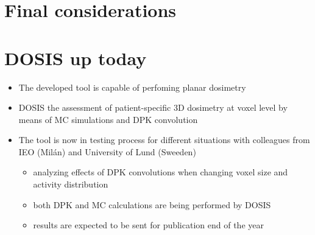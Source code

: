 \documentclass[ignorenonframetext,]{beamer}
\providecommand{\tightlist}{%
  \setlength{\itemsep}{0pt}\setlength{\parskip}{0pt}}
\begin{document}
\hypertarget{final-considerations}{%
\section{Final considerations}\label{final-considerations}}

\hypertarget{dosis-up-today}{%
\section{DOSIS up today}\label{dosis-up-today}}

\begin{itemize}
\item
  The developed tool is capable of perfoming planar dosimetry
\item
  DOSIS the assessment of patient-specific 3D dosimetry at voxel level
  by means of MC simulations and DPK convolution
\item
  The tool is now in testing process for different situations with
  colleagues from IEO (Milán) and University of Lund (Sweeden)

  \begin{itemize}
  \tightlist
  \item
    analyzing effects of DPK convolutions when changing voxel size and
    activity distribution
  \item
    both DPK and MC calculations are being performed by DOSIS
  \item
    results are expected to be sent for publication end of the year
  \end{itemize}
\end{itemize}
\end{document}
